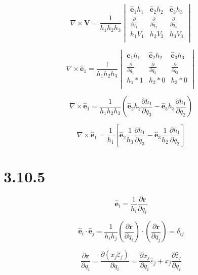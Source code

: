 \documentclass[12pt]{article}
\begin{document}
\[
    \nabla \times \textbf{V} = \frac{1}{h_1 h_2 h_3}
    \begin{vmatrix}
        \hat{\textbf{e}}_1 h_1        & \hat{\textbf{e}}_2 h_2        & \hat{\textbf{e}}_3 h_3        \\
        \frac{\partial}{\partial q_1} & \frac{\partial}{\partial q_2} & \frac{\partial}{\partial q_3} \\
        h_1 V_1                       & h_2 V_2                       & h_3 V_3                       \\
    \end{vmatrix}
\]

\[
    \nabla \times \hat{\textbf{e}}_1 = \frac{1}{h_1 h_2 h_3}
    \begin{vmatrix}
        \hat{\textbf{e}}_1 h_1        & \hat{\textbf{e}}_2 h_2        & \hat{\textbf{e}}_3 h_3        \\
        \frac{\partial}{\partial q_1} & \frac{\partial}{\partial q_2} & \frac{\partial}{\partial q_3} \\
        h_1*1                         & h_2*0                         & h_3*0                         \\
    \end{vmatrix}
\]

\[
    \nabla \times \hat{\textbf{e}}_1 = \frac{1}{h_1 h_2 h_3}
    \left(
    \hat{\textbf{e}}_2 h_2 \frac{\partial h_1}{\partial q_3}
    - \hat{\textbf{e}}_3 h_3 \frac{\partial h_1}{\partial q_2}
    \right)
\]

\[
    \nabla \times \hat{\textbf{e}}_1 = \frac{1}{h_1}
    \left[
        \hat{\textbf{e}}_2 \frac{1}{h_3} \frac{\partial h_1}{\partial q_3}
        - \hat{\textbf{e}}_3  \frac{1}{h_2}  \frac{\partial h_1}{\partial q_2}
        \right]
\]

\section{3.10.5}

\[
    \hat{\textbf{e}}_i = \frac{1}{h_i} \frac{\partial \textbf{r}}{\partial q_i}
\]

\[
    \hat{\textbf{e}}_i \cdot \hat{\textbf{e}}_j = \frac{1}{h_i h_j}
    \left(\frac{\partial \textbf{r}}{\partial q_i}\right)
    \cdot \left(\frac{\partial \textbf{r}}{\partial q_j}\right)  = \delta_{ij}
\]

\[
    \frac{\partial \textbf{r}}{\partial q_i} = \frac{\partial (x_j \hat{\varepsilon}_j)}{\partial q_i}
    = \frac{\partial x_j}{\partial q_i} \hat{\varepsilon}_j + x_j \frac{\partial \hat{\varepsilon}_j}{\partial q_i}
\]
\end{document}
